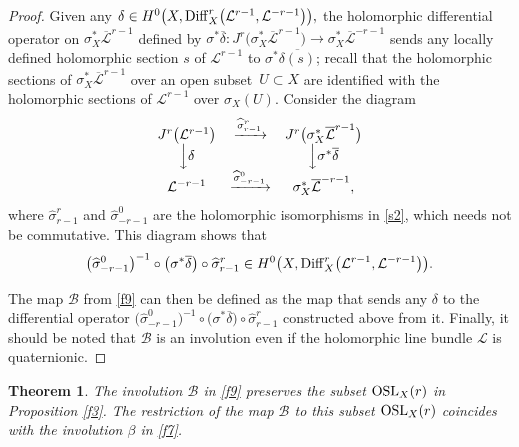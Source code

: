 \documentclass[pdftex]{sigma}
\numberwithin{equation}{section}
\newtheorem{Theorem}{Theorem}[section]
\begin{document}
\begin{proof} Given any $
\delta \in H^0\bigl(X, {\rm Diff}^r_X\bigl({\mathcal L}^{r-1},
{\mathcal L}^{-r-1}\bigr)\bigr),
$
the holomorphic differential operator on $\sigma^*_X \overline{\mathcal L}^{r-1}$ defined by
$
\sigma^*\overline{\delta}\colon J^r\bigl(\sigma^*_X \overline{\mathcal L}^{r-1}\bigr)
 \longrightarrow \sigma^*_X \overline{\mathcal L}^{-r-1}
$
sends any locally defined holomorphic section $s$ of ${\mathcal L}^{r-1}$ to
$\sigma^*\overline{\delta (s)}$; recall that the holomorphic sections of
$\sigma^*_X \overline{\mathcal L}^{r-1}$ over an open subset~$U \subset X$ are identified with the
holomorphic sections of ${\mathcal L}^{r-1}$ over $\sigma_X(U)$.
Consider the diagram
\[
\begin{matrix}
J^r\bigl({\mathcal L}^{r-1}\bigr) &\xrightarrow{\widehat{\sigma}^r_{r-1}} &
J^r\bigl(\sigma^*_X \overline{\mathcal L}^{r-1}\bigr)\\
 \Big\downarrow \delta && \Big\downarrow \sigma^*\overline{\delta}\\
{\mathcal L}^{-r-1} &\xrightarrow{\widehat{\sigma}^0_{-r-1}}&
\sigma^*_X \overline{\mathcal L}^{-r-1},
\end{matrix}
\]
where $\widehat{\sigma}^r_{r-1}$ and $\widehat{\sigma}^0_{-r-1}$ are the holomorphic isomorphisms
in \eqref{s2}, which needs not be commutative. This diagram shows that
\[
\bigl(\widehat{\sigma}^0_{-r-1}\bigr)^{-1}\circ \bigl(\sigma^*\overline{\delta}\bigr) \circ\widehat{\sigma}^r_{r-1}
 \in H^0\bigl(X, {\rm Diff}^r_X\bigl({\mathcal L}^{r-1}, {\mathcal L}^{-r-1}\bigr)\bigr).
\]

The map ${\mathcal B}$ from \eqref{f9} can then be defined as
the map that sends any $\delta$ to the differential operator
$\bigl(\widehat{\sigma}^0_{-r-1}\bigr)^{-1}\circ \bigl(\sigma^*\overline{\delta}\bigr)
\circ\widehat{\sigma}^r_{r-1}$ constructed above from it.
Finally, it should be noted that ${\mathcal B}$ is an
involution even if the holomorphic line bundle $\mathcal L$ is quaternionic.
\end{proof}

\begin{Theorem}\label{prop2}
The involution $\mathcal B$ in \eqref{f9} preserves the subset ${\rm OSL}_X(r)$ in Proposition {\rm \ref{f3}}.
The restriction of the map $\mathcal B$ to this subset ${\rm OSL}_X(r)$ coincides with the
involution $\beta$ in \eqref{f7}.
\end{Theorem}
\end{document}
